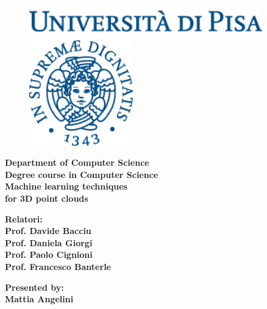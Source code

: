 \documentclass[12pt]{article}
\begin{document}
\begin{titlepage}
\begin{figure}[t]
	\centering\includegraphics[width=0.9\textwidth]{media/scritta}
    \centering\includegraphics[width=0.4\textwidth]{media/logo}
\end{figure}

\begin{center}
	\textbf{ Department of Computer Science\\ Degree course in Computer Science\\}
	\vspace{15mm}
    {\LARGE{\bf Machine learning techniques}}\\
	\vspace{3mm}
	{\LARGE{\bf for 3D point clouds}}\\
\end{center}

\vspace{20mm}

\begin{minipage}[t]{0.47\textwidth}
	{\large{\bf Relatori:\\ Prof. Davide Bacciu\\ Prof. Daniela Giorgi \\ Prof. Paolo Cignioni \\ Prof. Francesco Banterle}}
\end{minipage}\hfill\begin{minipage}[t]{0.47\textwidth}\raggedleft
	{\large{\bf Presented by: \\ Mattia Angelini\\ }}
\end{minipage}

\vspace{18mm}


\end{titlepage}
\end{document}
